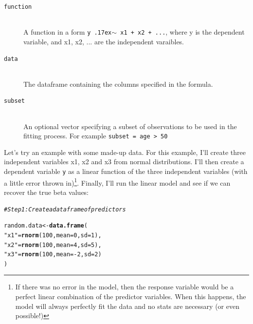 \documentclass{tufte-book}\usepackage[]{graphicx}\usepackage[]{color}
\makeatletter
\newcommand{\hlnum}[1]{\textcolor[rgb]{0.686,0.059,0.569}{#1}}%
\newcommand{\hlstr}[1]{\textcolor[rgb]{0.192,0.494,0.8}{#1}}%
\newcommand{\hlcom}[1]{\textcolor[rgb]{0.678,0.584,0.686}{\textit{#1}}}%
\newcommand{\hlopt}[1]{\textcolor[rgb]{0,0,0}{#1}}%
\newcommand{\hlstd}[1]{\textcolor[rgb]{0.345,0.345,0.345}{#1}}%
\newcommand{\hlkwb}[1]{\textcolor[rgb]{0.69,0.353,0.396}{#1}}%
\newcommand{\hlkwc}[1]{\textcolor[rgb]{0.333,0.667,0.333}{#1}}%
\newcommand{\hlkwd}[1]{\textcolor[rgb]{0.737,0.353,0.396}{\textbf{#1}}}%
\newenvironment{kframe}{%
 \def\at@end@of@kframe{}%
 \ifinner\ifhmode%
  \def\at@end@of@kframe{\end{minipage}}%
  \begin{minipage}{\columnwidth}%
 \fi\fi%
 \def\FrameCommand##1{\hskip\@totalleftmargin \hskip-\fboxsep
 \colorbox{shadecolor}{##1}\hskip-\fboxsep
     \hskip-\linewidth \hskip-\@totalleftmargin \hskip\columnwidth}%
 \MakeFramed {\advance\hsize-\width
   \@totalleftmargin\z@ \linewidth\hsize
   \@setminipage}}%
 {\par\unskip\endMakeFramed%
 \at@end@of@kframe}
\newenvironment{knitrout}{}{} %
\makeatother
\begin{document}
\begin{footnotesize}
{{\hline

\begin{description}

\item[\tt{function}] \hfill \\
A function in a form \texttt{y {\raise.17ex\hbox{$\scriptstyle\sim$}} x1 + x2 + ...}, where y is the dependent variable, and x1, x2, ... are the independent varaibles.

\item[\tt{data}] \hfill \\
  The dataframe containing the columns specified in the formula.
  
  \item[\tt{subset}] \hfill \\  
An optional vector specifying a subset of observations to be used in the fitting process. For example \texttt{subset = age > 50}

\end{description}

}
}
\vspace{5mm} %

Let's try an example with some made-up data. For this example, I'll create three independent variables x1, x2 and x3 from normal distributions. I'll then create a dependent variable \texttt{y} as a linear function of the three independent variables (with a little error thrown in)\footnote{If there was no error in the model, then the response variable would be a perfect linear combination of the predictor variables. When this happens, the model will always perfectly fit the data and no stats are necessary (or even possible!)}. Finally, I'll run the linear model and see if we can recover the true beta values:

\begin{footnotesize}
\begin{knitrout}
\color{fgcolor}\begin{kframe}
\begin{alltt}
\hlcom{# Step 1: Create a dataframe of predictors}

\hlstd{random.data} \hlkwb{<-} \hlkwd{data.frame}\hlstd{(}
             \hlstr{"x1"} \hlstd{=} \hlkwd{rnorm}\hlstd{(}\hlnum{100}\hlstd{,} \hlkwc{mean} \hlstd{=} \hlnum{0}\hlstd{,} \hlkwc{sd} \hlstd{=} \hlnum{1}\hlstd{),}
             \hlstr{"x2"} \hlstd{=} \hlkwd{rnorm}\hlstd{(}\hlnum{100}\hlstd{,} \hlkwc{mean} \hlstd{=} \hlnum{4}\hlstd{,} \hlkwc{sd} \hlstd{=} \hlnum{5}\hlstd{),}
             \hlstr{"x3"} \hlstd{=} \hlkwd{rnorm}\hlstd{(}\hlnum{100}\hlstd{,} \hlkwc{mean} \hlstd{=} \hlopt{-}\hlnum{2}\hlstd{,} \hlkwc{sd} \hlstd{=} \hlnum{2}\hlstd{)}
             \hlstd{)}


\end{alltt}
\end{kframe}
\end{knitrout}
\end{footnotesize}
\end{footnotesize}
\end{document}
